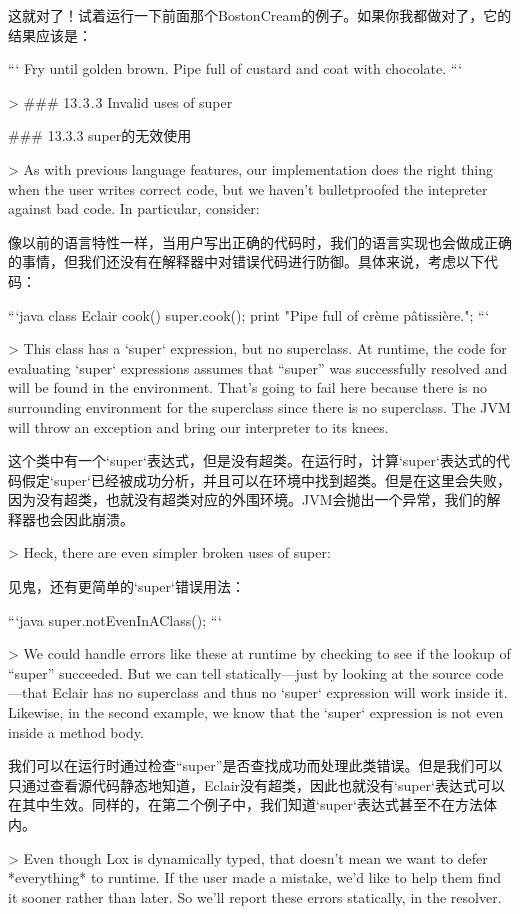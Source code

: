\documentclass[cn,11pt,chinese]{elegantbook}
\begin{document}
{{{{{{{{{{{{{{{{{{{{这就对了！试着运行一下前面那个BostonCream的例子。如果你我都做对了，它的结果应该是：

```
Fry until golden brown.
Pipe full of custard and coat with chocolate.
```

> ### 13 . 3 . 3 Invalid uses of super

### 13.3.3 super的无效使用

> As with previous language features, our implementation does the right thing when the user writes correct code, but we haven’t bulletproofed the intepreter against bad code. In particular, consider:

像以前的语言特性一样，当用户写出正确的代码时，我们的语言实现也会做成正确的事情，但我们还没有在解释器中对错误代码进行防御。具体来说，考虑以下代码：

```java
class Eclair {
  cook() {
    super.cook();
    print "Pipe full of crème pâtissière.";
  }
}
```

> This class has a `super` expression, but no superclass. At runtime, the code for evaluating `super` expressions assumes that “super” was successfully resolved and will be found in the environment. That’s going to fail here because there is no surrounding environment for the superclass since there is no superclass. The JVM will throw an exception and bring our interpreter to its knees.

这个类中有一个`super`表达式，但是没有超类。在运行时，计算`super`表达式的代码假定`super`已经被成功分析，并且可以在环境中找到超类。但是在这里会失败，因为没有超类，也就没有超类对应的外围环境。JVM会抛出一个异常，我们的解释器也会因此崩溃。

> Heck, there are even simpler broken uses of super:

见鬼，还有更简单的`super`错误用法：

```java
super.notEvenInAClass();
```

> We could handle errors like these at runtime by checking to see if the lookup of “super” succeeded. But we can tell statically—just by looking at the source code—that Eclair has no superclass and thus no `super` expression will work inside it. Likewise, in the second example, we know that the `super` expression is not even inside a method body.

我们可以在运行时通过检查“super”是否查找成功而处理此类错误。但是我们可以只通过查看源代码静态地知道，Eclair没有超类，因此也就没有`super`表达式可以在其中生效。同样的，在第二个例子中，我们知道`super`表达式甚至不在方法体内。

> Even though Lox is dynamically typed, that doesn’t mean we want to defer *everything* to runtime. If the user made a mistake, we’d like to help them find it sooner rather than later. So we’ll report these errors statically, in the resolver.

}}}}}}}}}}}}}}}}}}}}
\end{document}
